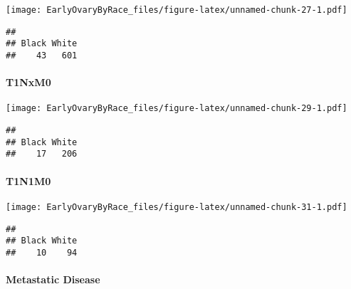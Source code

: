 \documentclass[
]{article}
\newenvironment{Shaded}{\begin{snugshade}}{\end{snugshade}}
\newcommand{\KeywordTok}[1]{\textcolor[rgb]{0.13,0.29,0.53}{\textbf{#1}}}
\newcommand{\NormalTok}[1]{#1}
\newcommand{\OperatorTok}[1]{\textcolor[rgb]{0.81,0.36,0.00}{\textbf{#1}}}
\begin{document}
\texttt{[image: EarlyOvaryByRace\_files/figure-latex/unnamed-chunk-27-1.pdf]}

\begin{Shaded}
\end{Shaded}

\begin{verbatim}
## 
## Black White 
##    43   601
\end{verbatim}

\hypertarget{t1nxm0-1}{%
\paragraph{T1NxM0}\label{t1nxm0-1}}

\texttt{[image: EarlyOvaryByRace\_files/figure-latex/unnamed-chunk-29-1.pdf]}

\begin{Shaded}
\end{Shaded}

\begin{verbatim}
## 
## Black White 
##    17   206
\end{verbatim}

\hypertarget{t1n1m0-1}{%
\paragraph{T1N1M0}\label{t1n1m0-1}}

\texttt{[image: EarlyOvaryByRace\_files/figure-latex/unnamed-chunk-31-1.pdf]}

\begin{Shaded}
\end{Shaded}

\begin{verbatim}
## 
## Black White 
##    10    94
\end{verbatim}

\hypertarget{metastatic-disease-1}{%
\paragraph{Metastatic Disease}\label{metastatic-disease-1}}
\end{document}

